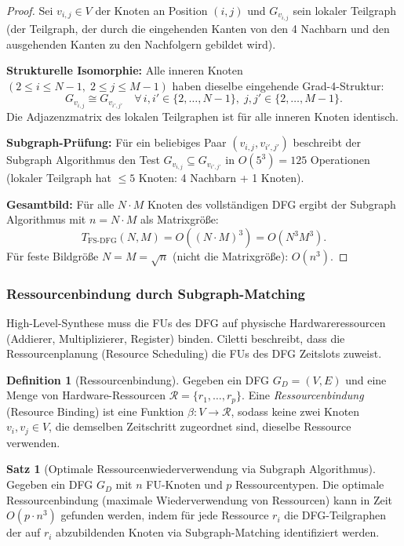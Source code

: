 ﻿\documentclass[a4paper,12pt]{article}
\theoremstyle{definition}
\newtheorem{definition}{Definition}
\newtheorem{satz}{Satz}
\begin{document}
\begin{proof}
  Sei $v_{i,j} \in V$ der Knoten an Position $(i,j)$ und $G_{v_{i,j}}$ sein lokaler
  Teilgraph (der Teilgraph, der durch die eingehenden Kanten von den 4 Nachbarn und
  den ausgehenden Kanten zu den Nachfolgern gebildet wird).

  \textbf{Strukturelle Isomorphie:} Alle inneren Knoten $(2 \leq i \leq N-1,\;
  2 \leq j \leq M-1)$ haben dieselbe eingehende Grad-4-Struktur:
  \[
    G_{v_{i,j}} \cong G_{v_{i',j'}} \quad \forall\, i,i' \in \{2,\ldots,N-1\},\;
    j,j' \in \{2,\ldots,M-1\}.
  \]
  Die Adjazenzmatrix des lokalen Teilgraphen ist für alle inneren Knoten identisch.

  \textbf{Subgraph-Prüfung:} Für ein beliebiges Paar $(v_{i,j}, v_{i',j'})$ beschreibt
  der Subgraph Algorithmus den Test $G_{v_{i,j}} \subseteq G_{v_{i',j'}}$ in
  $O(5^3) = 125$ Operationen (lokaler Teilgraph hat $\leq 5$ Knoten: 4 Nachbarn + 1 Knoten).

  \textbf{Gesamtbild:} Für alle $N \cdot M$ Knoten des vollständigen DFG ergibt der
  Subgraph Algorithmus mit $n = N \cdot M$ als Matrixgröße:
  \[
    T_{\text{FS-DFG}}(N,M) = O((N \cdot M)^3) = O(N^3 M^3).
  \]
  Für feste Bildgröße $N = M = \sqrt{n}$ (nicht die Matrixgröße): $O(n^3)$.
\end{proof}

\subsubsection{Ressourcenbindung durch Subgraph-Matching}

High-Level-Synthese muss die FUs des DFG auf physische Hardwareressourcen (Addierer,
Multiplizierer, Register) binden. Ciletti \cite[S.~576]{ciletti2011} beschreibt, dass
die Ressourcenplanung (Resource Scheduling) die FUs des DFG Zeitslots zuweist.

\begin{definition}[Ressourcenbindung]\label{def:ressourcenbindung}
  Gegeben ein DFG $G_D = (V, E)$ und eine Menge von Hardware-Ressourcen
  $\mathcal{R} = \{r_1, \ldots, r_p\}$. Eine \emph{Ressourcenbindung} (Resource Binding)
  ist eine Funktion $\beta: V \to \mathcal{R}$, sodass keine zwei Knoten $v_i, v_j \in V$,
  die demselben Zeitschritt zugeordnet sind, dieselbe Ressource verwenden.
\end{definition}

\begin{satz}[Optimale Ressourcenwiederverwendung via Subgraph Algorithmus]\label{satz:res_bind}
  Gegeben ein DFG $G_D$ mit $n$ FU-Knoten und $p$ Ressourcentypen. Die optimale
  Ressourcenbindung (maximale Wiederverwendung von Ressourcen) kann in Zeit $O(p \cdot n^3)$
  gefunden werden, indem für jede Ressource $r_i$ die DFG-Teilgraphen der auf $r_i$
  abzubildenden Knoten via Subgraph-Matching identifiziert werden.
\end{satz}
\end{document}
